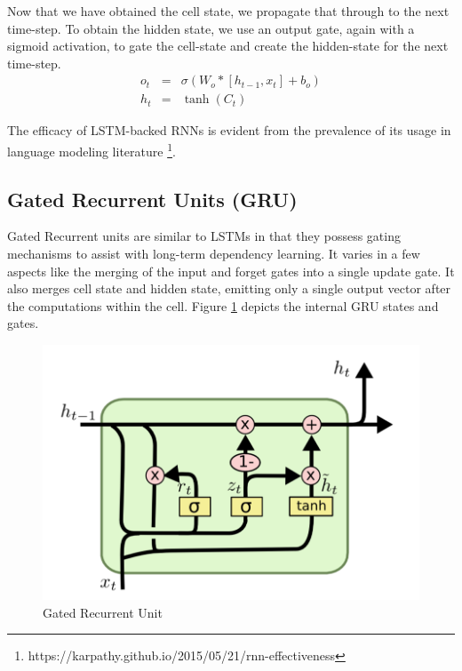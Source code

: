 Now that we have obtained the cell state, we propagate that through to the next time-step. To obtain the hidden state, we use an output gate, again with a sigmoid activation, to gate the cell-state and create the hidden-state for the next time-step.
\begin{eqnarray*}
	o_t &=& \sigma(W_o*[h_{t-1}, x_t] + b_o) \\
	h_t &=& \tanh(C_t)
\end{eqnarray*}

The efficacy of LSTM-backed RNNs is evident from the prevalence of its usage in language modeling literature \citep{sundermeyer2012lstm,gers2001lstm,graves2005framewise} \footnote{https://karpathy.github.io/2015/05/21/rnn-effectiveness}.

\subsection{Gated Recurrent Units (GRU)}

Gated Recurrent units \citep{cho2014learning} are similar to LSTMs in that they possess gating mechanisms to assist with long-term dependency learning. It varies in a few aspects like the merging of the input and forget gates into a single update gate. It also merges cell state and hidden state, emitting only a single output vector after the computations within the cell. Figure \ref{fig:gru} depicts the internal GRU states and gates.

\begin{figure}[ht]
	\centering
	\includegraphics[width=\textwidth]{images/gru}
	\caption{\label{fig:gru} Gated Recurrent Unit}
\end{figure}

